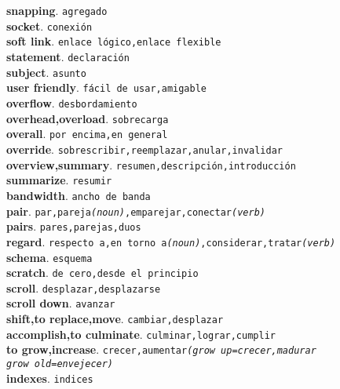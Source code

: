 \documentclass[twocolumn]{article}
\begin{document}
	\textsf{\textbf{snapping}}. \texttt{agregado}\\
	\textsf{\textbf{socket}}. \texttt{conexi\'on}\\
	\textsf{\textbf{soft link}}. \texttt{enlace l\'ogico,enlace flexible}\\
	\textsf{\textbf{statement}}. \texttt{declaraci\'on}\\
	\textsf{\textbf{subject}}. \texttt{asunto}\\
	\textsf{\textbf{user friendly}}. \texttt{f\'acil de usar,amigable}\\
	\textsf{\textbf{overflow}}. \texttt{desbordamiento}\\
	\textsf{\textbf{overhead,overload}}. \texttt{sobrecarga}\\
	\textsf{\textbf{overall}}. \texttt{por encima,en general}\\
	\textsf{\textbf{override}}. \texttt{sobrescribir,reemplazar,anular,invalidar}\\
	\textsf{\textbf{overview,summary}}. \texttt{resumen,descripci\'on,introducci\'on}\\
	\textsf{\textbf{summarize}}. \texttt{resumir}\\
	\textsf{\textbf{bandwidth}}. \texttt{ancho de banda}\\
	\textsf{\textbf{pair}}. \texttt{par,pareja{\scriptsize \textsl{(noun)}},emparejar,conectar{\scriptsize \textsl{(verb)}}}\\
	\textsf{\textbf{pairs}}. \texttt{pares,parejas,duos}\\
	\textsf{\textbf{regard}}. \texttt{respecto a,en torno a{\scriptsize \textsl{(noun)}},considerar,tratar{\scriptsize \textsl{(verb)}}}\\
	\textsf{\textbf{schema}}. \texttt{esquema}\\
	\textsf{\textbf{scratch}}. \texttt{de cero,desde el principio}\\
	\textsf{\textbf{scroll}}. \texttt{desplazar,desplazarse}\\
	\textsf{\textbf{scroll down}}. \texttt{avanzar}\\
	\textsf{\textbf{shift,to replace,move}}. \texttt{cambiar,desplazar}\\
	\textsf{\textbf{accomplish,to culminate}}. \texttt{culminar,lograr,cumplir}\\
	\textsf{\textbf{to grow,increase}}. \texttt{crecer,aumentar{\scriptsize \textsl{(grow up=crecer,madurar\\grow old=envejecer)}}}\\
	\textsf{\textbf{indexes}}. \texttt{indices}\\
\end{document}
